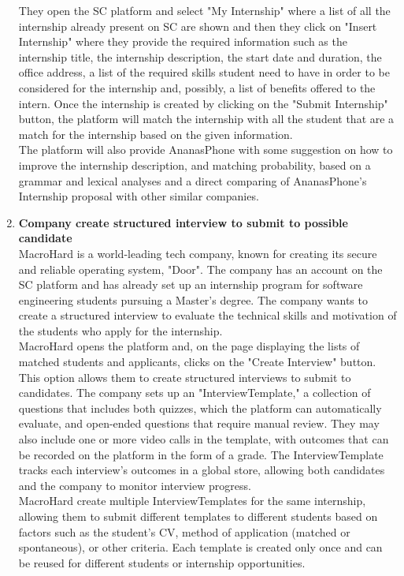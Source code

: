 \begin{enumerate}
        They open the SC platform and select "My Internship" where a list of all the internship already present on SC are shown and then they click on "Insert Internship" where they provide the required information such as the internship title, the internship description, the start date and duration, the office address, a list of the required skills student need to have in order to be considered for the internship and, possibly, a list of benefits offered to the intern.  Once the internship is created by clicking on the "Submit Internship" button, the platform will match the internship with all the student that are a match for the internship based on the given information.\\
        The platform will also provide AnanasPhone with some suggestion on how to improve the internship description, and matching probability, based on a grammar and lexical analyses and a direct comparing of AnanasPhone's Internship proposal with other similar companies.
    \item \textbf{Company create structured interview to submit to possible candidate}\\
        MacroHard is a world-leading tech company, known for creating its secure and reliable operating system, "Door". The company has an account on the SC platform and has already set up an internship program for software engineering students pursuing a Master’s degree. The company wants to create a structured interview to evaluate the technical skills and motivation of the students who apply for the internship.\\
        MacroHard opens the platform and, on the page displaying the lists of matched students and applicants, clicks on the "Create Interview" button. This option allows them to create structured interviews to submit to candidates. The company sets up an "InterviewTemplate," a collection of questions that includes both quizzes, which the platform can automatically evaluate, and open-ended questions that require manual review. They may also include one or more video calls in the template, with outcomes that can be recorded on the platform in the form of a grade. The InterviewTemplate tracks each interview’s outcomes in a global store, allowing both candidates and the company to monitor interview progress.\\
        MacroHard create multiple InterviewTemplates for the same internship, allowing them to submit different templates to different students based on factors such as the student’s CV, method of application (matched or spontaneous), or other criteria. Each template is created only once and can be reused for different students or internship opportunities.\\

\end{enumerate}
